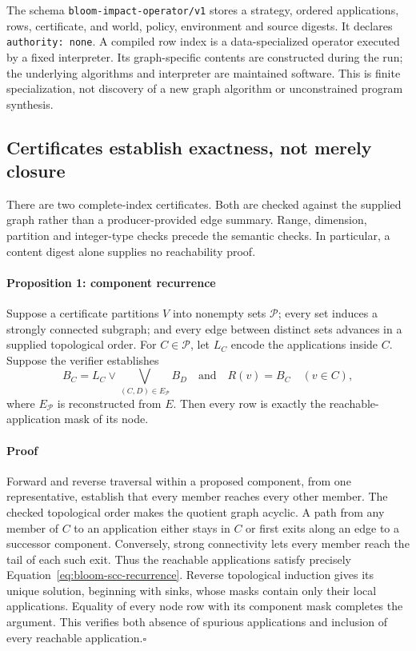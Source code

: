 \documentclass[11pt,letterpaper]{article}
\begin{document}
The schema \texttt{bloom-impact-operator/v1} stores a strategy, ordered applications, rows, certificate, and world, policy, environment and source digests. It declares \texttt{authority: none}. A compiled row index is a data-specialized operator executed by a fixed interpreter. Its graph-specific contents are constructed during the run; the underlying algorithms and interpreter are maintained software. This is finite specialization, not discovery of a new graph algorithm or unconstrained program synthesis.

\subsection{Certificates establish exactness, not merely closure}
\label{sec:bloom-certificates}

There are two complete-index certificates. Both are checked against the supplied graph rather than a producer-provided edge summary. Range, dimension, partition and integer-type checks precede the semantic checks. In particular, a content digest alone supplies no reachability proof.

\paragraph{Proposition 1: component recurrence}
Suppose a certificate partitions $V$ into nonempty sets $\mathcal{P}$; every set induces a strongly connected subgraph; and every edge between distinct sets advances in a supplied topological order. For $C\in\mathcal{P}$, let $L_C$ encode the applications inside $C$. Suppose the verifier establishes
\begin{equation}
 B_C=L_C\mathbin{\lor}\bigvee_{(C,D)\in E_{\mathcal P}}B_D
 \quad\text{and}\quad R(v)=B_C\quad(v\in C),
 \label{eq:bloom-scc-recurrence}
\end{equation}
where $E_{\mathcal P}$ is reconstructed from $E$. Then every row is exactly the reachable-application mask of its node.

\paragraph{Proof}
Forward and reverse traversal within a proposed component, from one representative, establish that every member reaches every other member. The checked topological order makes the quotient graph acyclic. A path from any member of $C$ to an application either stays in $C$ or first exits along an edge to a successor component. Conversely, strong connectivity lets every member reach the tail of each such exit. Thus the reachable applications satisfy precisely Equation~\ref{eq:bloom-scc-recurrence}. Reverse topological induction gives its unique solution, beginning with sinks, whose masks contain only their local applications. Equality of every node row with its component mask completes the argument. This verifies both absence of spurious applications and inclusion of every reachable application.\hfill$\square$
\end{document}
